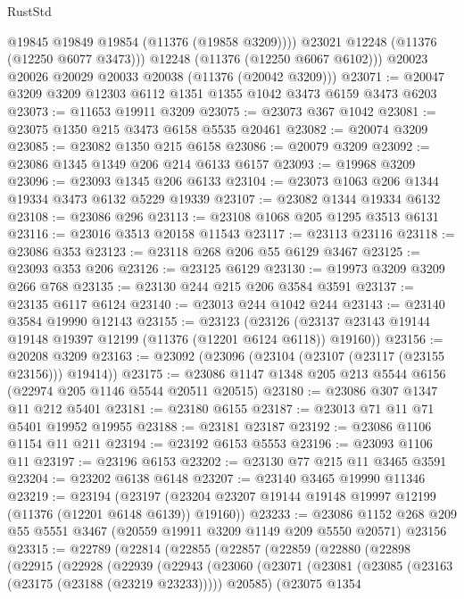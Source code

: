 \begin{lexlean}{RustStd}
\begin{coremodule}
{{{{{{{{{{{{{{{{{{{              @19845
              @19849
              @19854
              (@11376 (@19858 @3209))))
          @23021
          @12248
          (@11376 (@12250 @6077 @3473)))
        @12248
        (@11376 (@12250 @6067 @6102)))
      @20023
      @20026
      @20029
      @20033
      @20038
      (@11376 (@20042 @3209)))
@23071 := @20047 @3209 @3209 @12303 @6112 @1351 @1355 @1042 @3473 @6159 @3473 @6203
@23073 := @11653 @19911 @3209
@23075 := @23073 @367 @1042
@23081 := @23075 @1350 @215 @3473 @6158 @5535 @20461
@23082 := @20074 @3209
@23085 := @23082 @1350 @215 @6158
@23086 := @20079 @3209
@23092 := @23086 @1345 @1349 @206 @214 @6133 @6157
@23093 := @19968 @3209
@23096 := @23093 @1345 @206 @6133
@23104 := @23073 @1063 @206 @1344 @19334 @3473 @6132 @5229 @19339
@23107 := @23082 @1344 @19334 @6132
@23108 := @23086 @296
@23113 := @23108 @1068 @205 @1295 @3513 @6131
@23116 := @23016 @3513 @20158 @11543
@23117 := @23113 @23116
@23118 := @23086 @353
@23123 := @23118 @268 @206 @55 @6129 @3467
@23125 := @23093 @353 @206
@23126 := @23125 @6129
@23130 := @19973 @3209 @3209 @266 @768
@23135 := @23130 @244 @215 @206 @3584 @3591
@23137 := @23135 @6117 @6124
@23140 := @23013 @244 @1042 @244
@23143 := @23140 @3584 @19990 @12143
@23155 := @23123
    (@23126 (@23137 @23143 @19144 @19148 @19397 @12199 (@11376 (@12201 @6124 @6118)) @19160))
@23156 := @20208 @3209
@23163 := @23092 (@23096 (@23104 (@23107 (@23117 (@23155 @23156))) @19414))
@23175 := @23086 @1147 @1348 @205 @213 @5544 @6156 (@22974 @205 @1146 @5544 @20511 @20515)
@23180 := @23086 @307 @1347 @11 @212 @5401
@23181 := @23180 @6155
@23187 := @23013 @71 @11 @71 @5401 @19952 @19955
@23188 := @23181 @23187
@23192 := @23086 @1106 @1154 @11 @211
@23194 := @23192 @6153 @5553
@23196 := @23093 @1106 @11
@23197 := @23196 @6153
@23202 := @23130 @77 @215 @11 @3465 @3591
@23204 := @23202 @6138 @6148
@23207 := @23140 @3465 @19990 @11346
@23219 := @23194
    (@23197 (@23204 @23207 @19144 @19148 @19997 @12199 (@11376 (@12201 @6148 @6139)) @19160))
@23233 := @23086
    @1152
    @268
    @209
    @55
    @5551
    @3467
    (@20559 @19911 @3209 @1149 @209 @5550 @20571)
    @23156
@23315 := @22789
    (@22814
      (@22855
        (@22857
          (@22859
            (@22880
              (@22898
                (@22915
                  (@22928
                    (@22939
                      (@22943
                        (@23060
                          (@23071
                            (@23081 (@23085 (@23163 (@23175 (@23188 (@23219 @23233))))) @20585)
                            (@23075
                              @1354
}}}}}}}}}}}}}}}}}}}
\end{coremodule}
\end{lexlean}
